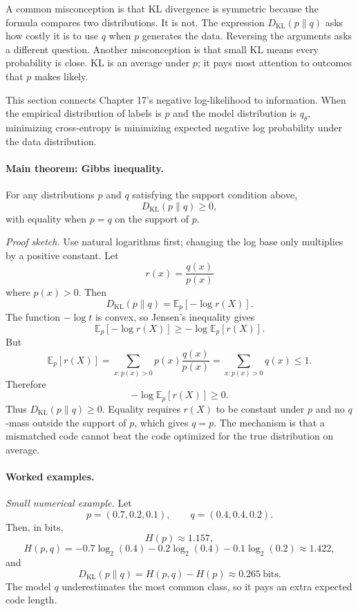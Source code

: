 A common misconception is that KL divergence is symmetric because the formula compares two distributions. It is not. The expression \(D_{\mathrm{KL}}(p\|q)\) asks how costly it is to use \(q\) when \(p\) generates the data. Reversing the arguments asks a different question. Another misconception is that small KL means every probability is close. KL is an average under \(p\); it pays most attention to outcomes that \(p\) makes likely.

This section connects Chapter 17's negative log-likelihood to information. When the empirical distribution of labels is \(p\) and the model distribution is \(q_\theta\), minimizing cross-entropy is minimizing expected negative log probability under the data distribution.

\paragraph{Main theorem: Gibbs inequality.}
For any distributions \(p\) and \(q\) satisfying the support condition above,
\[
\boxed{
D_{\mathrm{KL}}(p\|q)\ge 0,
}
\]
with equality when \(p=q\) on the support of \(p\).

\emph{Proof sketch.}
Use natural logarithms first; changing the log base only multiplies by a positive constant. Let
\[
r(x)=\frac{q(x)}{p(x)}
\]
where \(p(x)>0\). Then
\[
D_{\mathrm{KL}}(p\|q)
=\mathbb E_p\left[-\log r(X)\right].
\]
The function \(-\log t\) is convex, so Jensen's inequality gives
\[
\mathbb E_p[-\log r(X)]
\ge
-\log \mathbb E_p[r(X)].
\]
But
\[
\mathbb E_p[r(X)]
=\sum_{x:p(x)>0}p(x)\frac{q(x)}{p(x)}
=\sum_{x:p(x)>0}q(x)
\le 1.
\]
Therefore
\[
-\log \mathbb E_p[r(X)]\ge 0.
\]
Thus \(D_{\mathrm{KL}}(p\|q)\ge 0\). Equality requires \(r(X)\) to be constant under \(p\) and no \(q\)-mass outside the support of \(p\), which gives \(q=p\). The mechanism is that a mismatched code cannot beat the code optimized for the true distribution on average.

\paragraph{Worked examples.}
\emph{Small numerical example.}
Let
\[
p=(0.7,0.2,0.1),\qquad q=(0.4,0.4,0.2).
\]
Then, in bits,
\[
H(p)\approx 1.157,
\]
\[
H(p,q)
=-0.7\log_2(0.4)-0.2\log_2(0.4)-0.1\log_2(0.2)
\approx 1.422,
\]
and
\[
D_{\mathrm{KL}}(p\|q)
=H(p,q)-H(p)
\approx 0.265\ \text{bits}.
\]
The model \(q\) underestimates the most common class, so it pays an extra expected code length.

